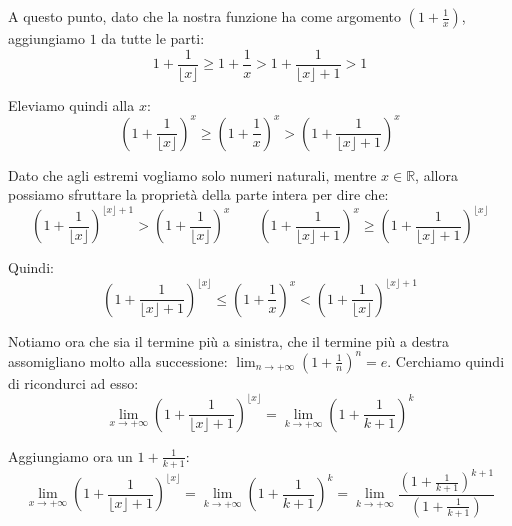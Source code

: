 \documentclass{article}
\begin{document}
\noindent A questo punto, dato che la nostra funzione ha come argomento $(1 + \frac{1}{x})$, aggiungiamo $1$ da tutte le parti:
\begin{equation*}
      1 + \frac{1}{\lfloor x \rfloor} \geq 1 + \frac{1}{x} > 1 + \frac{1}{\lfloor x \rfloor + 1} > 1
\end{equation*}

\noindent Eleviamo quindi alla $x$:
\begin{equation*}
      \left(1 + \frac{1}{\lfloor x \rfloor}\right)^x \geq \left(1 + \frac{1}{x}\right)^x > \left(1 + \frac{1}{\lfloor x \rfloor + 1}\right)^x
\end{equation*}

\noindent Dato che agli estremi vogliamo solo numeri naturali, mentre $x \in \mathbb{R}$, allora possiamo sfruttare la proprietà della parte intera per dire che:
\begin{equation*}
     \left(1 + \frac{1}{\lfloor x \rfloor}\right)^{\lfloor x \rfloor + 1} > \left(1 + \frac{1}{\lfloor x \rfloor}\right)^x \qquad \left(1 + \frac{1}{\lfloor x \rfloor + 1}\right)^x \geq \left(1 + \frac{1}{\lfloor x \rfloor + 1}\right)^{\lfloor x \rfloor}
\end{equation*}

\noindent Quindi:
\begin{equation*}
      \left(1 + \frac{1}{\lfloor x \rfloor + 1}\right)^{\lfloor x \rfloor} \leq \left(1 + \frac{1}{x}\right)^x < \left(1 + \frac{1}{\lfloor x \rfloor}\right)^{\lfloor x \rfloor + 1}
\end{equation*}

\noindent Notiamo ora che sia il termine più a sinistra, che il termine più a destra assomigliano molto alla successione: $\lim_{n \to +\infty} (1 + \frac{1}{n})^n = e$. Cerchiamo quindi di ricondurci ad esso:
\begin{equation*}
    \lim_{x \to +\infty} \left(1 + \frac{1}{\lfloor x \rfloor + 1}\right)^{\lfloor x \rfloor} = \lim_{k \to +\infty} \left(1 + \frac{1}{k + 1}\right)^k
\end{equation*}

\noindent Aggiungiamo ora un $1 + \frac{1}{k + 1}$:
\begin{equation*}
    \lim_{x \to +\infty} \left(1 + \frac{1}{\lfloor x \rfloor + 1}\right)^{\lfloor x \rfloor} = \lim_{k \to +\infty} \left(1 + \frac{1}{k + 1}\right)^k = \lim_{k \to +\infty} \frac{\left(1 + \frac{1}{k + 1}\right)^{k + 1}}{\left(1 + \frac{1}{k + 1}\right)}
\end{equation*}
\end{document}
